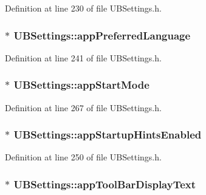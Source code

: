 Definition at line 230 of file U\-B\-Settings.\-h.

\hypertarget{class_u_b_settings_a68816e710a1a3b22a25c9317460d9c17}{
\subsubsection[{app\-Preferred\-Language}]{$\ast$ U\-B\-Settings\-::app\-Preferred\-Language}}\label{db/d66/class_u_b_settings_a68816e710a1a3b22a25c9317460d9c17}


Definition at line 241 of file U\-B\-Settings.\-h.

\hypertarget{class_u_b_settings_a0f7efdf202b7e78bd7580fc02aeed079}{
\subsubsection[{app\-Start\-Mode}]{$\ast$ U\-B\-Settings\-::app\-Start\-Mode}}\label{db/d66/class_u_b_settings_a0f7efdf202b7e78bd7580fc02aeed079}


Definition at line 267 of file U\-B\-Settings.\-h.

\hypertarget{class_u_b_settings_adf80724a5b19f7164a194113d40b8e1f}{
\subsubsection[{app\-Startup\-Hints\-Enabled}]{$\ast$ U\-B\-Settings\-::app\-Startup\-Hints\-Enabled}}\label{db/d66/class_u_b_settings_adf80724a5b19f7164a194113d40b8e1f}


Definition at line 250 of file U\-B\-Settings.\-h.

\hypertarget{class_u_b_settings_af6b6c89b2d241903e226439882764b0c}{
\subsubsection[{app\-Tool\-Bar\-Display\-Text}]{$\ast$ U\-B\-Settings\-::app\-Tool\-Bar\-Display\-Text}}\label{db/d66/class_u_b_settings_af6b6c89b2d241903e226439882764b0c}


